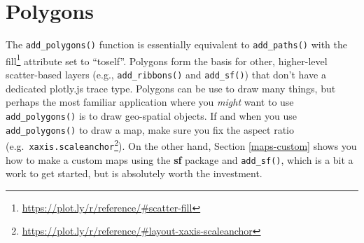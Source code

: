 \documentclass[
  12pt,
]{krantz}
\newenvironment{Shaded}{\begin{snugshade}}{\end{snugshade}}
\newcommand{\DataTypeTok}[1]{\textcolor[rgb]{0.13,0.29,0.53}{#1}}
\newcommand{\FloatTok}[1]{\textcolor[rgb]{0.00,0.00,0.81}{#1}}
\newcommand{\KeywordTok}[1]{\textcolor[rgb]{0.13,0.29,0.53}{\textbf{#1}}}
\newcommand{\NormalTok}[1]{#1}
\newcommand{\OperatorTok}[1]{\textcolor[rgb]{0.81,0.36,0.00}{\textbf{#1}}}
\newcommand{\OtherTok}[1]{\textcolor[rgb]{0.56,0.35,0.01}{#1}}
\newcommand{\StringTok}[1]{\textcolor[rgb]{0.31,0.60,0.02}{#1}}
\renewcommand{\href}[2]{#2\footnote{\url{#1}}}
\begin{document}
\hypertarget{polygons}{%
\section{Polygons}\label{polygons}}

The \texttt{add\_polygons()} function is essentially equivalent to \texttt{add\_paths()} with the \href{https://plot.ly/r/reference/\#scatter-fill}{fill} attribute set to ``toself''. Polygons form the basis for other, higher-level scatter-based layers (e.g., \texttt{add\_ribbons()} and \texttt{add\_sf()}) that don't have a dedicated plotly.js trace type. Polygons can be use to draw many things, but perhaps the most familiar application where you \emph{might} want to use \texttt{add\_polygons()} is to draw geo-spatial objects. If and when you use \texttt{add\_polygons()} to draw a map, make sure you fix the aspect ratio (e.g.~\href{https://plot.ly/r/reference/\#layout-xaxis-scaleanchor}{\texttt{xaxis.scaleanchor}}). On the other hand, Section \ref{maps-custom} shows you how to make a custom maps using the \textbf{sf} package and \texttt{add\_sf()}, which is a bit a work to get started, but is absolutely worth the investment.

\begin{Shaded}
\end{Shaded}
\end{document}
